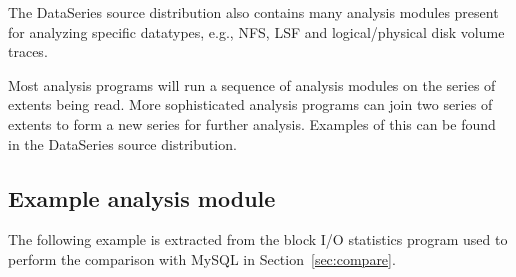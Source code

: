 The DataSeries source distribution also contains many
analysis modules present for analyzing specific datatypes, e.g., NFS, LSF
and logical/physical disk volume traces.

Most analysis programs will run a sequence of analysis modules on the
series of extents being read.  More sophisticated analysis programs
can join two series of extents to form a new series for further
analysis. Examples of this can be found in the DataSeries source distribution.


\subsection{Example analysis module}
The following example is extracted from the block I/O statistics program
used to perform the comparison with MySQL in Section~\ref{sec:compare}.


